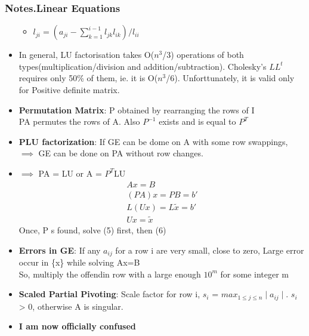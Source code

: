 \documentclass[12pt,letterpaper]{article}
\newcommand\asgnname{Notes}         %
\newenvironment{answer}[1]{
  \subsubsection*{%
  \asgnname.#1}
}{\newpage}
\begin{document}
\begin{answer}{Linear Equations}
\begin{itemize}
\begin{itemize}
        \item $l_{ji} = (a_{ji} - \sum _{k=1}^{i-1} l_{jk}l_{ik})/l_{ii}$
    \end{itemize}
    \item In general, LU factorisation takes O($n^3$/3) operations of both types(multiplication/division and addition/subtraction). Cholesky's $LL^t$ requires only 50\% of them, ie. it is O($n^3$/6). Unforttunately, it is valid only for Positive definite matrix.
    \item \textbf{Permutation Matrix}: P obtained by rearranging the rows of I\\
    PA permutes the rows of A. Also $P^{-1}$ exists and is equal to $P^T$
    \item \textbf{PLU factorization}: If GE can be dome on A with some row swappings, $\implies$ GE can be done on PA without row changes.
    \item $\implies$ PA = LU or A = $P^T$LU
    \begin{align}
        Ax = B\\
        (PA)x = PB = b'\\
        L(Ux) = L\tilde{x} = b'\\
        Ux = \tilde{x}
    \end{align}
    Once, P s found, solve (5) first, then (6)
    \item \textbf{Errors in GE}: If any $a_{ij}$ for a row i are very small, close to zero, Large error occur in \{x\} while solving Ax=B\\
    So, multiply the offendin row with a large enough $10^m$ for some integer m
    \item \textbf{Scaled Partial Pivoting}: Scale factor for row i, $s_i$ = $max_{1\le j\le n} \mid a_{ij} \mid$. $s_i$ > 0, otherwise A is singular.
    \item \textbf{I am now officially confused}
\end{itemize}
\end{answer}
\end{document}
